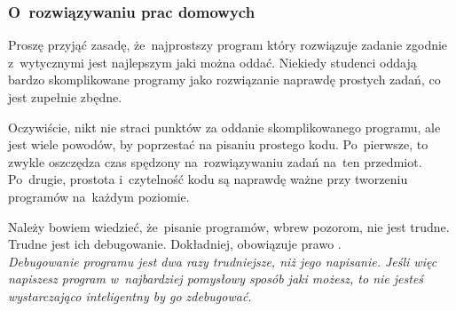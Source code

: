 \documentclass[10pt,t]{beamer}
\begin{document}
\begin{frame}
  \frametitle{O~rozwiązywaniu prac domowych}


  Proszę przyjąć zasadę, że~\alert{najprostszy program} który rozwiązuje
  zadanie zgodnie z~wytycznymi jest najlepszym jaki można oddać. Niekiedy
  studenci oddają bardzo skomplikowane programy jako rozwiązanie naprawdę
  prostych zadań, co jest zupełnie zbędne.

  Oczywiście, nikt nie straci punktów za oddanie skomplikowanego programu,
  ale jest wiele powodów, by poprzestać na pisaniu prostego kodu.
  Po~pierwsze, to zwykle oszczędza czas spędzony na~rozwiązywaniu zadań
  na~ten przedmiot. Po~drugie, prostota i~czytelność kodu są naprawdę ważne
  przy tworzeniu programów na~każdym poziomie.

  Należy bowiem wiedzieć, że~pisanie programów, wbrew pozorom,
  \alert{nie} jest trudne. \alert{Trudne jest ich debugowanie.}
  Dokładniej, obowiązuje prawo
  . \\
  \textit{Debugowanie programu jest dwa razy trudniejsze, niż jego
    napisanie. Jeśli więc napiszesz program w~najbardziej pomysłowy sposób
    jaki możesz, to nie jesteś wystarczająco inteligentny by go zdebugować.}






\end{frame}
\end{document}
